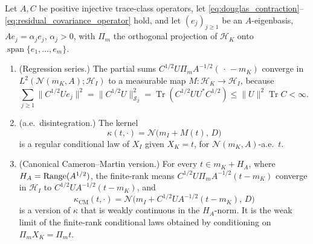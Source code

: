 \begin{theorem}
\label{lem:exhaustion_disintegration}
Let $A,C$ be positive injective trace-class operators, let
\eqref{eq:douglas_contraction}--\eqref{eq:residual_covariance_operator} hold, and
let $(e_j)_{j\ge1}$ be an $A$-eigenbasis, $Ae_j=\alpha_je_j$,
$\alpha_j>0$, with $\Pi_m$ the orthogonal projection of $\mathcal{H}_K$ onto
$\operatorname{span}\{e_1,\ldots,e_m\}$.
\begin{enumerate}[label=(\roman*)]
\item \textup{(Regression series.)} The partial sums
$C^{1/2}U\Pi_mA^{-1/2}(\,\cdot\,-m_K)$ converge in
$L^2(\mathcal{N}(m_K,A);\mathcal{H}_I)$ to a measurable map
$M:\mathcal{H}_K\to\mathcal{H}_I$, because
\[
  \sum_{j\ge1}\|C^{1/2}Ue_j\|^2
  =\|C^{1/2}U\|_{\mathcal{S}_2}^2
  =\operatorname{Tr}(C^{1/2}UU^*C^{1/2})
  \le\|U\|^2\operatorname{Tr}C<\infty.
\]
\item \textup{(a.e.\ disintegration.)} The kernel
\[
  \kappa(t,\cdot)=\mathcal{N}\!\bigl(m_I+M(t),\,D\bigr)
\]
is a regular conditional law of $X_I$ given $X_K=t$, for
$\mathcal{N}(m_K,A)$-a.e.\ $t$.
\item \textup{(Canonical Cameron--Martin version.)} For every
$t\in m_K+H_A$, where $H_A=\operatorname{Range}(A^{1/2})$, the finite-rank means
$C^{1/2}U\Pi_mA^{-1/2}(t-m_K)$ converge in $\mathcal{H}_I$ to
$C^{1/2}UA^{-1/2}(t-m_K)$, and
\[
  \kappa_{\mathrm{CM}}(t,\cdot)
  =\mathcal{N}\!\bigl(m_I+C^{1/2}UA^{-1/2}(t-m_K),\,D\bigr)
\]
is a version of $\kappa$ that is weakly continuous in the $H_A$-norm.  It is the
weak limit of the finite-rank conditional laws obtained by conditioning on
$\Pi_mX_K=\Pi_mt$.
\end{enumerate}
\end{theorem}

